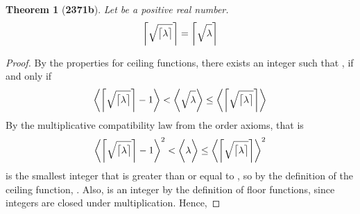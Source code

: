 \documentclass[preview]{standalone}
\newtheorem{theorem}{Theorem}
\begin{document}
\begin{theorem}[\textbf{2371b}]
    Let \bm{$\lambda$} be a positive real number.
    \begin{equation*}
        \relax{
            \bigg \lceil 
                \sqrt{ \strut \big \lceil \lambda \big \rceil }
            \bigg \rceil 
                = 
            \bigg \lceil \sqrt{ \strut \lambda } \bigg \rceil
        }
    \end{equation*}
\end{theorem}

\begin{proof}
    By the properties for ceiling functions,
    there exists an integer
    \bm{$\big \lceil \sqrt{ \lceil \lambda \rceil} \big \rceil$}
    such that
    \bm{$
        \big \lceil \sqrt{ \lambda } \big \rceil
            =
        \big \lceil \sqrt{ \lceil \lambda \rceil} \big \rceil$
    },
    if and only if
    \begin{equation*}
        \bigg \langle
            \bigg \lceil
                \sqrt{ \strut \big \lceil \lambda \big \rceil }
            \bigg \rceil
                -
            1
        \bigg \rangle
            <
        \bigg \langle
            \sqrt{ \strut \lambda }
        \bigg \rangle
            \leq
        \bigg \langle
            \bigg \lceil
                \sqrt{ \strut \big \lceil \lambda \big \rceil }
            \bigg \rceil
        \bigg \rangle
    \end{equation*}
    By the multiplicative compatibility law from the order axioms, that is
    \begin{equation*}
        \bigg \langle
            \bigg \lceil
                \sqrt{ \strut \big \lceil \lambda \big \rceil }
            \bigg \rceil
                -
            1
        \bigg \rangle
            ^2
            <
        \bigg \langle
            \lambda
        \bigg \rangle
            \leq
        \bigg \langle
            \bigg \lceil
                \sqrt{ \strut \big \lceil \lambda \big \rceil }
            \bigg \rceil
        \bigg \rangle
            ^2
    \end{equation*}
    \bm{$\big \lceil \lambda \big \rceil$} is the smallest integer that is greater than or equal to \bm{$\lambda$},
    so by the definition of the ceiling function, 
    \bm{$\lambda \leq \big \lceil \lambda \big \rceil$}.
    Also, 
    is an integer by the definition of floor functions,
    since integers are closed under multiplication.
    Hence,

\end{proof}
\end{document}
